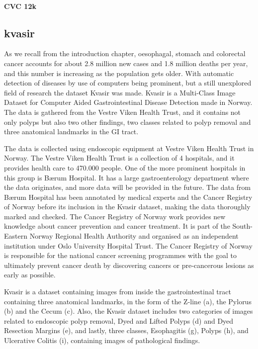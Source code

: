  


\paragraph{CVC 12k}






\iffalse

\subsection{kvasir}


As we recall from the introduction chapter, oesophagal, stomach and colorectal cancer accounts for about 2.8 million new cases and 1.8 million deaths per year, and this number is increasing as the population gets older.   With automatic detection of diseases by use of computers being prominent, but a still unexplored field of research the dataset Kvasir was made.
Kvasir is a Multi-Class Image Dataset for Computer Aided Gastrointestinal Disease Detection made in Norway. The data is gathered from the Vestre Viken Health Trust, and it contains not only polyps but also two other findings, two classes related to polyp removal and three anatomical landmarks in the GI tract.

The data is collected using endoscopic equipment at Vestre Viken Health Trust in Norway. The Vestre Viken Health Trust is a collection of 4 hospitals, and it provides health care to 470.000 people.
One of the more prominent hospitals in this group is Bærum Hospital. It has a large gastroenterology department where the data originates, and more data will be provided in the future. The data from Bærum Hospital has been annotated by medical experts and the Cancer Registry of Norway before its inclusion in the Kvasir dataset, making the data thoroughly marked and checked.
The Cancer Registry of Norway work provides new knowledge about cancer prevention and cancer treatment. It is part of the South-Eastern Norway Regional Health Authority and organised as an independent institution under Oslo University Hospital Trust. The Cancer Registry of Norway is responsible for the national cancer screening programmes with the goal to ultimately prevent cancer death by discovering cancers or pre-cancerous lesions as early as possible. 

\cite{runeMedico2018}

Kvasir is a dataset containing images from inside the gastrointestinal tract containing three anatomical landmarks, in the form of the Z-line (a), the Pylorus (b) and the Cecum (c). Also, the Kvasir dataset includes two categories of images related to endoscopic polyp removal, Dyed and Lifted Polyps (d) and Dyed Resection Margins (e), and lastly, three classes, Esophagitis (g), Polyps (h), and Ulcerative Colitis (i), containing images of pathological findings.


